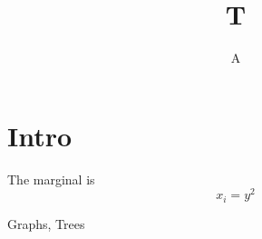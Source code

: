\documentclass{article}
\begin{document}
\title{T}\author{A}
\maketitle
\section{Intro}
The marginal is
$$ x_i = y^2 $$
\begin{keywords}
Graphs, Trees
\end{keywords}
\end{document}
